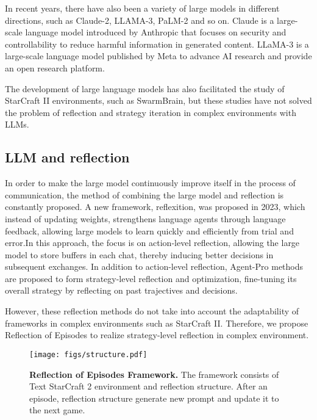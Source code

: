 In recent years, there have also been a variety of large models in different directions, such as Claude-2\cite{Claude-2}, LLAMA-3\cite{LLAMA-3}, PaLM-2\cite{PaLM-2} and so on. Claude is a large-scale language model introduced by Anthropic that focuses on security and controllability to reduce harmful information in generated content. LLaMA-3 is a large-scale language model published by Meta to advance AI research and provide an open research platform. 

The development of large language models has also facilitated the study of StarCraft II environments, such as SwarmBrain\cite{SwarmBrain}, but these studies have not solved the problem of reflection and strategy iteration in complex environments with LLMs.


\subsection{LLM and reflection}
In order to make the large model continuously improve itself in the process of communication, the method of combining the large model and reflection is constantly proposed. A new framework, reflexition\cite{reflextion}, was proposed in 2023, which instead of updating weights, strengthens language agents through language feedback, allowing large models to learn quickly and efficiently from trial and error.In this approach, the focus is on action-level reflection, allowing the large model to store buffers in each chat, thereby inducing better decisions in subsequent exchanges.
In addition to action-level reflection, Agent-Pro\cite{Agent-Pro} methods are proposed to form strategy-level reflection and optimization, fine-tuning its overall strategy by reflecting on past trajectives and decisions.

However, these reflection methods do not take into account the adaptability of frameworks in complex environments such as StarCraft II. Therefore, we propose Reflection of Episodes to realize strategy-level reflection in complex environment.

%
%
%
%
\begin{figure}[htbp]
\centerline{\texttt{[image: figs/structure.pdf]}}
\caption{\textbf{Reflection of Episodes Framework.} The framework consists of Text StarCraft 2 environment and reflection structure. After an episode, reflection structure generate new prompt and update it to the next game.} \label{fig2}
\end{figure}